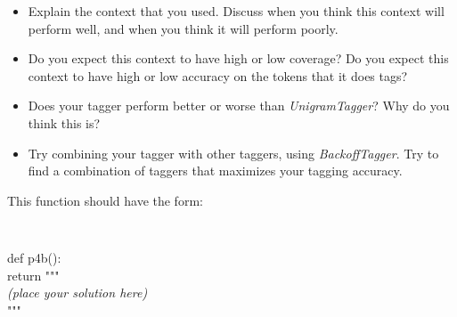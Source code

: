 \documentclass{cis530}
\begin{document}
\begin{itemize}
    \item Explain the context that you used.  Discuss when you think
    this context will perform well, and when you think it will perform
    poorly.  

    \item Do you expect this context to have high or low coverage?  Do
    you expect this context to have high or low accuracy on the tokens
    that it does tags?

    \item Does your tagger perform better or worse than
    \textit{UnigramTagger}?  Why do you think this is?

    \item Try combining your tagger with other taggers, using
    \textit{BackoffTagger}.  Try to find a combination of taggers that
    maximizes your tagging accuracy.
\end{itemize}

This function should have the form:

{\tt
\begin{tabbing}
def p4b():\\
\qquad return """\\
\textit{(place your solution here)}\\
"""
\end{tabbing}
}
\end{document}
